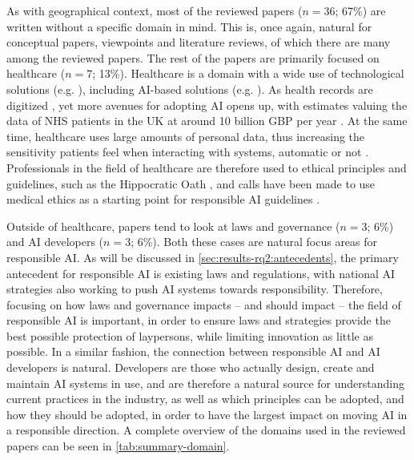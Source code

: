 As with geographical context, most of the reviewed papers ($n = 36$; 67\%) are written without a specific domain in mind. This is, once again, natural for conceptual papers, viewpoints and literature reviews, of which there are many among the reviewed papers. The rest of the papers are primarily focused on healthcare ($n = 7$; 13\%). Healthcare is a domain with a wide use of technological solutions (e.g. \cite{Azaria_2016,Martinez_2008,Son_2014}), including AI-based solutions (e.g. \cite{Singh_2023,Kumar_2023}). As health records are digitized \parencite{Rajkomar_2018}, yet more avenues for adopting AI opens up, with estimates valuing the data of NHS patients in the UK at around 10 billion GBP per year \parencite{Downey_2019}. At the same time, healthcare uses large amounts of personal data, thus increasing the sensitivity patients feel when interacting with systems, automatic or not \parencite{Gupta_2021}. Professionals in the field of healthcare are therefore used to ethical principles and guidelines, such as the Hippocratic Oath \parencite{Wiesing_2020}, and calls have been made to use medical ethics as a starting point for responsible AI guidelines \parencite{DaltonBrown_2020, Siala_2022}.

Outside of healthcare, papers tend to look at laws and governance ($n = 3$; 6\%) and AI developers ($n = 3$; 6\%). Both these cases are natural focus areas for responsible AI. As will be discussed in \autoref{sec:results-rq2:antecedents}, the primary antecedent for responsible AI is existing laws and regulations, with national AI strategies also working to push AI systems towards responsibility. Therefore, focusing on how laws and governance impacts -- and should impact -- the field of responsible AI is important, in order to ensure laws and strategies provide the best possible protection of laypersons, while limiting innovation as little as possible. In a similar fashion, the connection between responsible AI and AI developers is natural. Developers are those who actually design, create and maintain AI systems in use, and are therefore a natural source for understanding current practices in the industry, as well as which principles can be adopted, and how they should be adopted, in order to have the largest impact on moving AI in a responsible direction. A complete overview of the domains used in the reviewed papers can be seen in \autoref{tab:summary-domain}.

